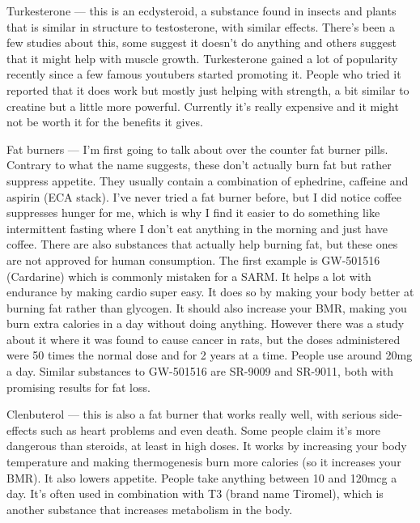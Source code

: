 \documentclass[openany, 12pt]{book}
\begin{document}
        Turkesterone --- this is an ecdysteroid, a substance found in insects and plants that is similar in structure to testosterone, with similar effects. There's been a few studies about this,
        some suggest it doesn't do anything and others suggest that it might help with muscle growth.
        Turkesterone gained a lot of popularity recently since a few famous youtubers started promoting it.
        People who tried it reported that it does work but mostly just helping with strength, a bit similar to creatine but a little more powerful.
        Currently it's really expensive and it might not be worth it for the benefits it gives.

        Fat burners --- I'm first going to talk about over the counter fat burner pills.
        Contrary to what the name suggests, these don't actually burn fat but rather suppress appetite. They usually contain a combination of ephedrine, caffeine and
        aspirin (ECA stack). I've never tried a fat burner before, but I did notice coffee suppresses hunger for me,
        which is why I find it easier to do something like intermittent fasting where I don't eat anything in the morning and just have coffee.
        There are also substances that actually help burning fat, but these ones are not approved for human consumption. The first example is GW-501516 (Cardarine)
        which is commonly mistaken for a SARM. It helps a lot with endurance by making cardio super easy.
        It does so by making your body better at burning fat
        rather than glycogen. It should also increase your BMR, making you burn extra calories in a day without doing anything.
        However there was a study about it where it was found to cause cancer in rats, but the doses administered were 50 times the normal dose and for 2 years at a time.
        People use around 20mg a day. Similar substances to GW-501516 are SR-9009 and SR-9011, both with promising results for fat loss.

        Clenbuterol --- this is also a fat burner that works really well, with serious side-effects such as heart problems and even death.
        Some people claim it's more dangerous than steroids, at least in high doses.
        It works by increasing your body temperature and making thermogenesis burn more calories (so it increases your BMR).
        It also lowers appetite. People take anything between 10 and 120mcg a day. It's often used in combination with T3 (brand name Tiromel),
        which is another substance that increases metabolism in the body. 
\end{document}
